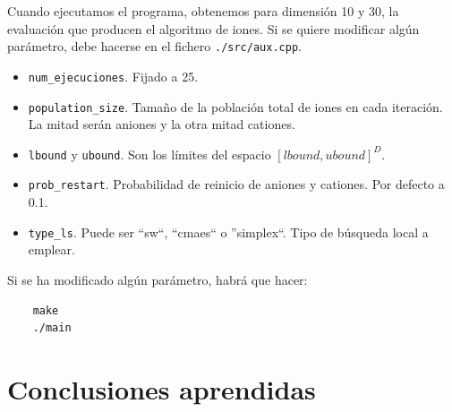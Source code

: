 \documentclass[a4paper,11pt]{article}
\begin{document}
Cuando ejecutamos el programa, obtenemos para dimensión 10 y 30, la evaluación que producen el algoritmo de iones.
Si se quiere modificar algún parámetro, debe hacerse en el fichero \texttt{./src/aux.cpp}. 

\begin{itemize}
 \item \texttt{num\_ejecuciones}. Fijado a 25.
 \item \texttt{population\_size}. Tamaño de la población total de iones en cada iteración. La mitad serán aniones y la otra
 mitad cationes.
 \item \texttt{lbound} y \texttt{ubound}. Son los límites del espacio $[lbound, ubound]^D$.
 \item \texttt{prob\_restart}. Probabilidad de reinicio de aniones y cationes. Por defecto a 0.1.
 \item \texttt{type\_ls}. Puede ser ``sw``, ``cmaes`` o ''simplex``. Tipo de búsqueda local a emplear.
\end{itemize}

Si se ha modificado algún parámetro, habrá que hacer:
\begin{verbatim}
    make
    ./main
\end{verbatim}



\section{Conclusiones aprendidas}
\end{document}
